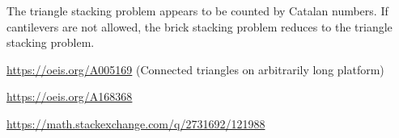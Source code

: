 \documentclass{article}
\begin{document}
\begin{note}
  The triangle stacking problem appears to be counted by Catalan numbers.
  If cantilevers are not allowed, the brick stacking problem reduces to the
  triangle stacking problem.
\end{note}
\begin{references}
  \item \url{https://oeis.org/A005169} (Connected triangles on arbitrarily long platform)
  \item \url{https://oeis.org/A168368}
  \item \url{https://math.stackexchange.com/q/2731692/121988}
\end{references}
\end{document}
